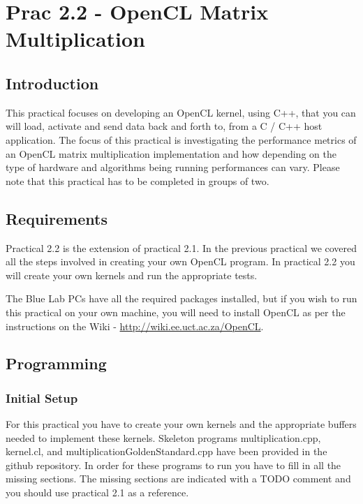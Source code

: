 \newpage
\section{Prac 2.2 - OpenCL Matrix Multiplication}
\label{sec:Prac2}

\subsection{Introduction}

This practical focuses on  developing an OpenCL kernel, using C++, that you can will load, activate and send data back and forth to, from a C / C++ host application. The focus of this practical is investigating the performance metrics of an OpenCL matrix multiplication implementation and how depending on the type of hardware and algorithms being running performances can vary. Please note that this practical has to be completed in groups of two.

\subsection{Requirements}
Practical 2.2 is the extension of practical 2.1. In the previous practical we covered all the steps involved in creating your own OpenCL program. In practical 2.2 you will create your own kernels and run the appropriate tests.

The Blue Lab PCs have all the required packages installed, but if you wish to run this practical on your own machine, you will need to install OpenCL as per the instructions on the Wiki - \href{http://wiki.ee.uct.ac.za/OpenCL}{http://wiki.ee.uct.ac.za/OpenCL}. 

\subsection{Programming}
\subsubsection{Initial Setup}
For this practical you have to create your own kernels and the appropriate buffers needed to implement these kernels. Skeleton programs multiplication.cpp, kernel.cl, and multiplicationGoldenStandard.cpp have been provided in the github repository. In order for these programs to run you have to fill in all the missing sections. The missing sections are indicated with a TODO comment and you should use practical 2.1 as a reference.

